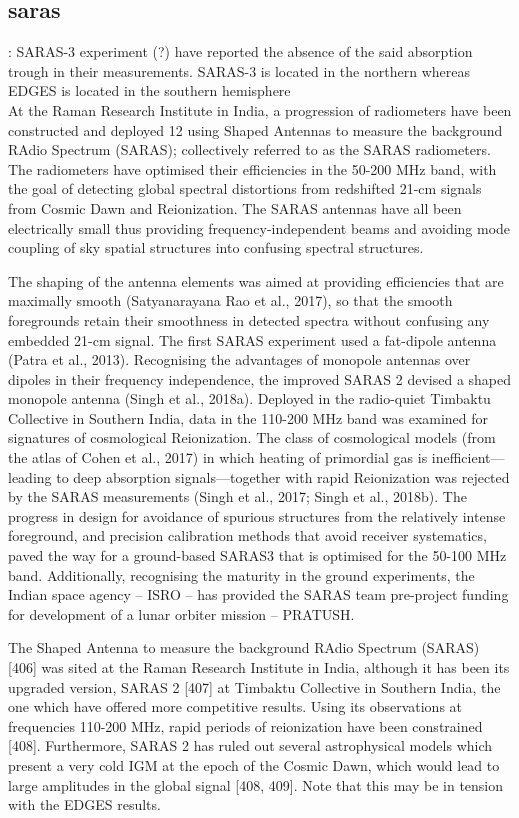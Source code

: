 \documentclass[12pt, TexShade, letterpaper]{report}
\begin{document}
\subsection{\gls{saras}}: SARAS-3 experiment (?) have reported the absence of the said absorption trough in their measurements. SARAS-3 is located in the northern whereas EDGES is located in the southern hemisphere \cite{hyperion_1}\\
At the Raman Research Institute in India, a progression of radiometers have been constructed and deployed 12 using Shaped Antennas to measure the background RAdio Spectrum (SARAS); collectively referred to as the SARAS radiometers. The radiometers have optimised their efficiencies in the 50-200 MHz band, with the goal of detecting global spectral distortions from redshifted 21-cm signals from Cosmic Dawn and Reionization. The SARAS antennas have all been electrically small thus providing frequency-independent beams and avoiding mode coupling of sky spatial structures into confusing spectral structures. \cite{dark_ages_space}\par
The shaping of the antenna elements was aimed at providing efficiencies that are maximally smooth (Satyanarayana Rao et al., 2017), so that the smooth foregrounds retain their smoothness in detected spectra without confusing any embedded 21-cm signal. The first SARAS experiment used a fat-dipole antenna (Patra et al., 2013). Recognising the advantages of monopole antennas over dipoles in their frequency independence, the improved SARAS 2 devised a shaped monopole antenna (Singh et al., 2018a). Deployed in the radio-quiet Timbaktu Collective in Southern India, data in the 110-200 MHz band was examined for signatures of cosmological Reionization. The class of cosmological models (from the atlas of Cohen et al., 2017) in which heating of primordial gas is inefficient---leading to deep absorption signals---together with rapid Reionization was rejected by the SARAS measurements (Singh et al., 2017;
Singh et al., 2018b). The progress in design for avoidance of spurious structures from the relatively intense foreground, and precision calibration methods that avoid receiver systematics, paved the way for a ground-based SARAS3 that is optimised for the 50-100 MHz band. Additionally, recognising the maturity in the ground experiments, the Indian space agency – ISRO – has provided the SARAS team pre-project funding for development of a lunar orbiter mission – PRATUSH. \cite{dark_ages_space}\par
The Shaped Antenna to measure the background RAdio Spectrum (SARAS) [406] was sited at the Raman Research Institute in India, although it has been its upgraded version, SARAS 2 [407] at Timbaktu Collective in Southern India, the one which have offered more competitive results. Using its observations at frequencies 110-200 MHz, rapid periods of reionization have been constrained [408]. Furthermore, SARAS 2 has ruled out several astrophysical models which present a very cold IGM at the epoch of the Cosmic Dawn, which would lead to large amplitudes in the global signal [408, 409]. Note that this may be in tension with the EDGES results.\cite{thesis_shedding} \par
\end{document}
